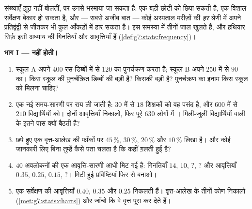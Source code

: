 \begin{problem}[{सप्ताहांत समस्या --- गिनती बनाम आवृत्ति, वह
सर्वेक्षण जिसने पूरे देश को धोखा दिया, और दो अस्पतालों का
विरोधाभास}]
\label{pb:g7:stats:1}
संख्याएँ झूठ नहीं बोलतीं, पर उनसे भरमाया जा सकता है: एक बड़ी 
छोटी  को छिपा सकती है, एक विशाल सर्वेक्षण बेकार हो सकता है,
और --- सबसे अजीब बात --- कोई अस्पताल मरीज़ों की \emph{हर} श्रेणी
में अपने प्रतिद्वंद्वी से जीतकर भी कुल आँकड़ों में हार सकता है। इस
समस्या में तीनों जाल खुलते हैं, और हथियार सिर्फ़ इसी अध्याय की
गिनतियाँ और आवृत्तियाँ हैं (\cref{def:g7:stats:frequency})।

\medskip
\noindent\textbf{भाग I ---   नहीं होती।}
\begin{enumerate}
  \item स्कूल A अपने $400$ रस-डिब्बों में से $120$ का पुनर्चक्रण
        करता है; स्कूल B अपने $250$ में से $90$ का। किस स्कूल की
        पुनर्चक्रित डिब्बों की \emph{} बड़ी है? किसकी
        \emph{} बड़ी है? पुनर्चक्रण का इनाम किस स्कूल को
        मिलना चाहिए?
  \item एक नई समय-सारणी पर राय ली जाती है: $30$ में से $18$
        शिक्षकों को वह पसंद है, और $600$ में से $210$
        विद्यार्थियों को। दोनों आवृत्तियाँ निकालो, फिर पूरे $630$
        लोगों में । मिली-जुली  विद्यार्थियों वाली
         के इतने पास क्यों बैठती है?
  \item छपे हुए एक वृत्त-आलेख की फाँकों पर $45\,\%$, $30\,\%$,
        $20\,\%$ और $10\,\%$ लिखा है। और कोई जानकारी लिए बिना
        तुम्हें कैसे पता चलता है कि कहीं ग़लती हुई है?
  \item $40$ अवलोकनों की एक आवृत्ति-सारणी आधी मिट गई है: गिनतियाँ
        $14$, $10$, $?$, $?$ और आवृत्तियाँ $0.35$, $0.25$,
        $0.15$, $?$। मिटी हुई प्रविष्टियाँ फिर से बनाओ।
  \item एक सर्वेक्षण की आवृत्तियाँ $0.40$, $0.35$ और $0.25$
        निकलती हैं। वृत्त-आलेख के तीनों कोण निकालो
        (\cref{met:g7:stats:charts}) और जाँचो कि वे वृत्त पूरा
        कर देते हैं।
\end{enumerate}


\end{problem}
